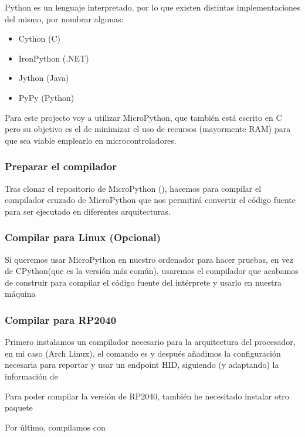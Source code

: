 Python es un lenguaje interpretado, por lo que existen distintas implementaciones del mismo, por nombrar algunas: 
\begin{itemize}
  \item Cython (C)
  \item IronPython (.NET)
  \item Jython (Java)
  \item PyPy (Python)
\end{itemize}
Para este projecto voy a utilizar MicroPython, que también está escrito en C pero su objetivo es el de minimizar el uso de recursos (mayormente RAM) para que sea viable emplearlo en microcontroladores.

\subsubsection{Preparar el compilador}
Tras clonar el repositorio de MicroPython (), hacemos  para compilar el compilador cruzado de MicroPython que nos permitirá convertir el código fuente para ser ejecutado en diferentes arquitecturas.

\subsubsection{Compilar para Linux (Opcional)}
Si queremos usar MicroPython en nuestro ordenador para hacer pruebas, en vez de CPython(que es la versión más común), usaremos el compilador que acabamos de construir para compilar el código fuente del intérprete y usarlo en nuestra máquina 


\subsubsection{Compilar para RP2040}
Primero instalamos un compilador necesario para la arquitectura del procesador, en mi caso (Arch Linux), el comando es  y después añadimos la configuración necesaria para reportar y usar un endpoint HID, siguiendo (y adaptando) la información de \textbf{\textcite{tusb-rp2}} \newpage
{}

\vspace{-1cm} 
Para poder compilar la versión de RP2040, también he necesitado instalar otro paquete \mybreak {} \par

Por último, compilamos con 

